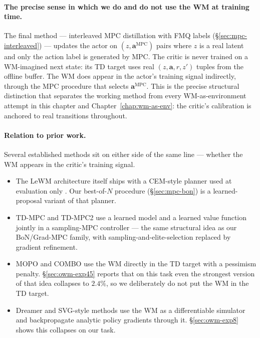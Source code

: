 \paragraph{The precise sense in which we do and do not use the WM at
training time.} The final method --- interleaved MPC distillation with
FMQ labels (§\ref{sec:mpc-interleaved}) --- updates the actor on
$(z, \mathbf{a}^{\text{MPC}})$ pairs where $z$ is a real latent and only
the action label is generated by MPC. The critic is never trained on a
WM-imagined next state: its TD target uses real $(z, \mathbf{a}, r, z')$
tuples from the offline buffer. The WM does appear in the actor's
training signal indirectly, through the MPC procedure that selects
$\mathbf{a}^{\text{MPC}}$. This is the precise structural distinction
that separates the working method from every WM-as-environment attempt
in this chapter and Chapter~\ref{chap:wm-as-env}: the critic's
calibration is anchored to real transitions throughout.

\paragraph{Relation to prior work.}
Several established methods sit on either side of the same line ---
whether the WM appears in the critic's training signal.
\begin{itemize}
    \item The LeWM architecture itself ships with a CEM-style planner used
    at evaluation only \cite{maes2026leworldmodelstableendtoendjointembedding}.
    Our best-of-$N$ procedure (§\ref{sec:mpc-bon}) is a learned-proposal
    variant of that planner.
    \item TD-MPC \cite{hansen2022tdmpc} and TD-MPC2 \cite{hansen2024tdmpc2}
    use a learned model and a learned value function jointly in a
    sampling-MPC controller --- the same structural idea as our
    BoN/Grad-MPC family, with sampling-and-elite-selection replaced by
    gradient refinement.
    \item MOPO \cite{yu2020mopomodelbasedofflinepolicy} and
    COMBO \cite{yu2021combo} use the WM directly in the TD target with a
    pessimism penalty. §\ref{sec:owm-exp45} reports that on this task
    even the strongest version of that idea collapses to $2.4\%$, so we
    deliberately do not put the WM in the TD target.
    \item Dreamer \cite{hafner2020dreamer} and SVG-style methods
    \cite{heess2015svg} use the WM as a differentiable simulator and
    backpropagate analytic policy gradients through it.
    §\ref{sec:owm-exp8} shows this collapses on our task.
\end{itemize}

